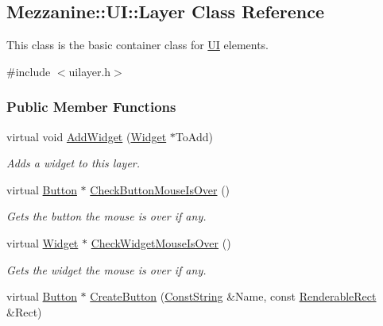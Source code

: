 \hypertarget{classMezzanine_1_1UI_1_1Layer}{
\subsection{Mezzanine::UI::Layer Class Reference}
\label{classMezzanine_1_1UI_1_1Layer}
}


This class is the basic container class for \hyperlink{namespaceMezzanine_1_1UI}{UI} elements.  




{\ttfamily \#include $<$uilayer.h$>$}

\subsubsection*{Public Member Functions}
\begin{DoxyCompactItemize}
\item 
virtual void \hyperlink{classMezzanine_1_1UI_1_1Layer_a930991c1e3d5906fc9d347ca281084ab}{AddWidget} (\hyperlink{classMezzanine_1_1UI_1_1Widget}{Widget} $\ast$ToAdd)
\begin{DoxyCompactList}\small\item\em Adds a widget to this layer. \item\end{DoxyCompactList}\item 
virtual \hyperlink{classMezzanine_1_1UI_1_1Button}{Button} $\ast$ \hyperlink{classMezzanine_1_1UI_1_1Layer_a5f53df62a577dbbbb279248e8c9d1673}{CheckButtonMouseIsOver} ()
\begin{DoxyCompactList}\small\item\em Gets the button the mouse is over if any. \item\end{DoxyCompactList}\item 
virtual \hyperlink{classMezzanine_1_1UI_1_1Widget}{Widget} $\ast$ \hyperlink{classMezzanine_1_1UI_1_1Layer_af3353560fdd740f172492807fff4b98f}{CheckWidgetMouseIsOver} ()
\begin{DoxyCompactList}\small\item\em Gets the widget the mouse is over if any. \item\end{DoxyCompactList}\item 
virtual \hyperlink{classMezzanine_1_1UI_1_1Button}{Button} $\ast$ \hyperlink{classMezzanine_1_1UI_1_1Layer_a15606e99cf9cf34cb991556d87f1c44e}{CreateButton} (\hyperlink{namespaceMezzanine_a63cd699ac54b73953f35ec9cfc05e506}{ConstString} \&Name, const \hyperlink{structMezzanine_1_1UI_1_1RenderableRect}{RenderableRect} \&Rect)

\end{DoxyCompactItemize}

